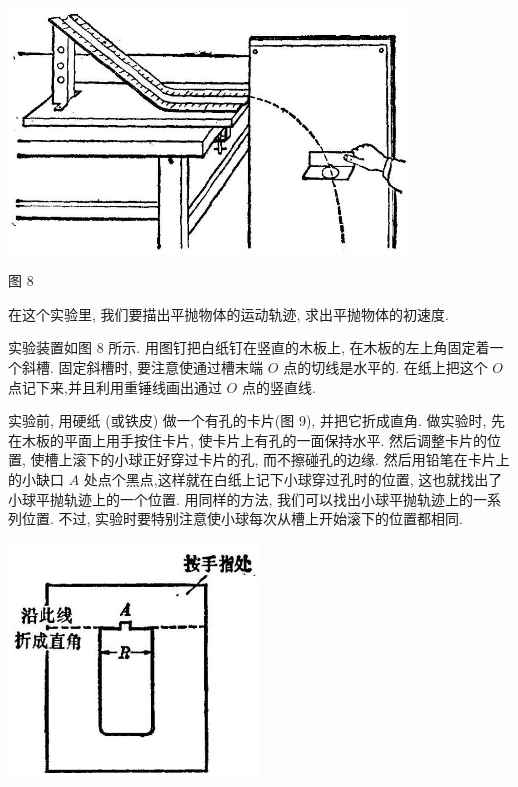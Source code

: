 \documentclass[10pt]{article}
\begin{document}
\begin{center}
\includegraphics[max width=0.8\textwidth]{images/01912d55-147c-70aa-b0e0-1782a122f948_326_665585.jpg}
\end{center}

图 8

在这个实验里, 我们要描出平抛物体的运动轨迹, 求出平抛物体的初速度.

实验装置如图 8 所示. 用图钉把白纸钉在竖直的木板上, 在木板的左上角固定着一个斜槽. 固定斜槽时, 要注意使通过槽末端 \(O\) 点的切线是水平的. 在纸上把这个 \(O\) 点记下来,并且利用重锤线画出通过 \(O\) 点的竖直线.

实验前, 用硬纸 (或铁皮) 做一个有孔的卡片(图 9), 并把它折成直角. 做实验时, 先在木板的平面上用手按住卡片, 使卡片上有孔的一面保持水平. 然后调整卡片的位置, 使槽上滚下的小球正好穿过卡片的孔, 而不擦碰孔的边缘. 然后用铅笔在卡片上的小缺口 \(A\) 处点个黑点,这样就在白纸上记下小球穿过孔时的位置, 这也就找出了小球平抛轨迹上的一个位置. 用同样的方法, 我们可以找出小球平抛轨迹上的一系列位置. 不过, 实验时要特别注意使小球每次从槽上开始滚下的位置都相同.

\begin{center}
\includegraphics[max width=0.5\textwidth]{images/01912d55-147c-70aa-b0e0-1782a122f948_327_899435.jpg}
\end{center}
\end{document}
